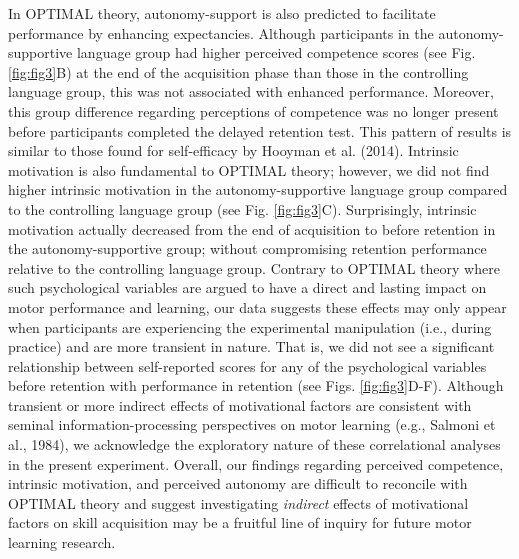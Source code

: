 \documentclass[
  man, donotrepeattitle,mask,floatsintext]{apa7}
\begin{document}
In OPTIMAL theory, autonomy-support is also predicted to facilitate performance by enhancing expectancies. Although participants in the autonomy-supportive language group had higher perceived competence scores (see Fig. \ref{fig:fig3}B) at the end of the acquisition phase than those in the controlling language group, this was not associated with enhanced performance. Moreover, this group difference regarding perceptions of competence was no longer present before participants completed the delayed retention test. This pattern of results is similar to those found for self-efficacy by Hooyman et al. (2014). Intrinsic motivation is also fundamental to OPTIMAL theory; however, we did not find higher intrinsic motivation in the autonomy-supportive language group compared to the controlling language group (see Fig. \ref{fig:fig3}C). Surprisingly, intrinsic motivation actually decreased from the end of acquisition to before retention in the autonomy-supportive group; without compromising retention performance relative to the controlling language group. Contrary to OPTIMAL theory where such psychological variables are argued to have a direct and lasting impact on motor performance and learning, our data suggests these effects may only appear when participants are experiencing the experimental manipulation (i.e., during practice) and are more transient in nature. That is, we did not see a significant relationship between self-reported scores for any of the psychological variables before retention with performance in retention (see Figs. \ref{fig:fig3}D-F). Although transient or more indirect effects of motivational factors are consistent with seminal information-processing perspectives on motor learning (e.g., Salmoni et al., 1984), we acknowledge the exploratory nature of these correlational analyses in the present experiment. Overall, our findings regarding perceived competence, intrinsic motivation, and perceived autonomy are difficult to reconcile with OPTIMAL theory and suggest investigating \emph{indirect} effects of motivational factors on skill acquisition may be a fruitful line of inquiry for future motor learning research.
\end{document}
